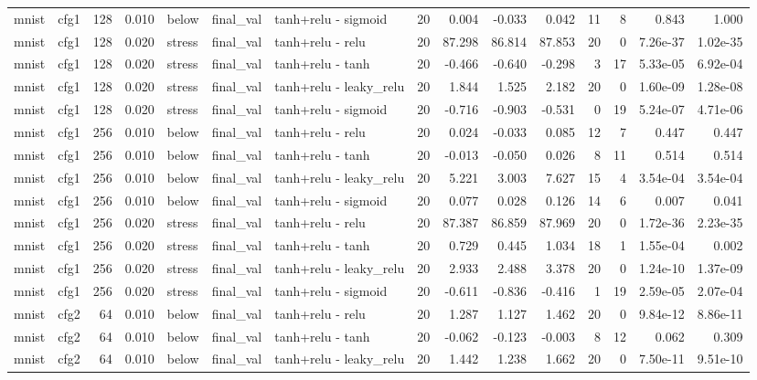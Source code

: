 \begin{table}[htbp]
{\begin{tabular}{@{}llrrlllrrrrrrrr@{}}
mnist & cfg1 & 128 & 0.010 & below & final\_val & tanh+relu - sigmoid & 20 & 0.004 & -0.033 & 0.042 & 11 & 8 & 0.843 & 1.000 \\
mnist & cfg1 & 128 & 0.020 & stress & final\_val & tanh+relu - relu & 20 & 87.298 & 86.814 & 87.853 & 20 & 0 & 7.26e-37 & 1.02e-35 \\
mnist & cfg1 & 128 & 0.020 & stress & final\_val & tanh+relu - tanh & 20 & -0.466 & -0.640 & -0.298 & 3 & 17 & 5.33e-05 & 6.92e-04 \\
mnist & cfg1 & 128 & 0.020 & stress & final\_val & tanh+relu - leaky\_relu & 20 & 1.844 & 1.525 & 2.182 & 20 & 0 & 1.60e-09 & 1.28e-08 \\
mnist & cfg1 & 128 & 0.020 & stress & final\_val & tanh+relu - sigmoid & 20 & -0.716 & -0.903 & -0.531 & 0 & 19 & 5.24e-07 & 4.71e-06 \\
mnist & cfg1 & 256 & 0.010 & below & final\_val & tanh+relu - relu & 20 & 0.024 & -0.033 & 0.085 & 12 & 7 & 0.447 & 0.447 \\
mnist & cfg1 & 256 & 0.010 & below & final\_val & tanh+relu - tanh & 20 & -0.013 & -0.050 & 0.026 & 8 & 11 & 0.514 & 0.514 \\
mnist & cfg1 & 256 & 0.010 & below & final\_val & tanh+relu - leaky\_relu & 20 & 5.221 & 3.003 & 7.627 & 15 & 4 & 3.54e-04 & 3.54e-04 \\
mnist & cfg1 & 256 & 0.010 & below & final\_val & tanh+relu - sigmoid & 20 & 0.077 & 0.028 & 0.126 & 14 & 6 & 0.007 & 0.041 \\
mnist & cfg1 & 256 & 0.020 & stress & final\_val & tanh+relu - relu & 20 & 87.387 & 86.859 & 87.969 & 20 & 0 & 1.72e-36 & 2.23e-35 \\
mnist & cfg1 & 256 & 0.020 & stress & final\_val & tanh+relu - tanh & 20 & 0.729 & 0.445 & 1.034 & 18 & 1 & 1.55e-04 & 0.002 \\
mnist & cfg1 & 256 & 0.020 & stress & final\_val & tanh+relu - leaky\_relu & 20 & 2.933 & 2.488 & 3.378 & 20 & 0 & 1.24e-10 & 1.37e-09 \\
mnist & cfg1 & 256 & 0.020 & stress & final\_val & tanh+relu - sigmoid & 20 & -0.611 & -0.836 & -0.416 & 1 & 19 & 2.59e-05 & 2.07e-04 \\
mnist & cfg2 & 64 & 0.010 & below & final\_val & tanh+relu - relu & 20 & 1.287 & 1.127 & 1.462 & 20 & 0 & 9.84e-12 & 8.86e-11 \\
mnist & cfg2 & 64 & 0.010 & below & final\_val & tanh+relu - tanh & 20 & -0.062 & -0.123 & -0.003 & 8 & 12 & 0.062 & 0.309 \\
mnist & cfg2 & 64 & 0.010 & below & final\_val & tanh+relu - leaky\_relu & 20 & 1.442 & 1.238 & 1.662 & 20 & 0 & 7.50e-11 & 9.51e-10 \\

\end{tabular}}
\end{table}
